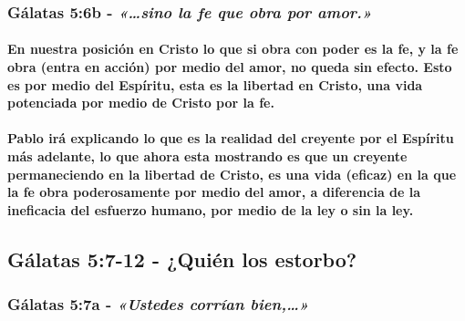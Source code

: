 \documentclass[11a pt,twoside]{article}
\newcommand{\scripture}[1]{%
  {\fontsize{12pt}{16pt}\selectfont\ScriptureFont\itshape #1}%
}
\let\oldsubsection\subsection
\renewcommand{\subsection}{\needspace{5\baselineskip}\oldsubsection}
\let\oldsubsubsection\subsubsection
\renewcommand{\subsubsection}{\needspace{4\baselineskip}\oldsubsubsection}
\let\oldparagraph\paragraph
\renewcommand{\paragraph}{\needspace{3\baselineskip}\oldparagraph}
\begin{document}
\subsubsection{\texorpdfstring{Gálatas 5:6b -
\scripture{«…sino la fe que obra por amor.»}}{Gálatas 5:6b - }}\label{guxe1latas-56b---sino-la-fe-que-obra-por-amor.}

\paragraph{En nuestra posición en Cristo lo que si obra con poder es la
fe, y la fe obra (entra en acción) por medio del amor, no queda sin
efecto. Esto es por medio del Espíritu, esta es la libertad en Cristo,
una vida potenciada por medio de Cristo por la
fe.}\label{en-nuestra-posiciuxf3n-en-cristo-lo-que-si-obra-con-poder-es-la-fe-y-la-fe-obra-entra-en-acciuxf3n-por-medio-del-amor-no-queda-sin-efecto.-esto-es-por-medio-del-espuxedritu-esta-es-la-libertad-en-cristo-una-vida-potenciada-por-medio-de-cristo-por-la-fe.}

\paragraph{Pablo irá explicando lo que es la realidad del creyente por
el Espíritu más adelante, lo que ahora esta mostrando es que un creyente
permaneciendo en la libertad de Cristo, es una vida (eficaz) en la que
la fe obra poderosamente por medio del amor, a diferencia de la
ineficacia del esfuerzo humano, por medio de la ley o sin la
ley.}\label{pablo-iruxe1-explicando-lo-que-es-la-realidad-del-creyente-por-el-espuxedritu-muxe1s-adelante-lo-que-ahora-esta-mostrando-es-que-un-creyente-permaneciendo-en-la-libertad-de-cristo-es-una-vida-eficaz-en-la-que-la-fe-obra-poderosamente-por-medio-del-amor-a-diferencia-de-la-ineficacia-del-esfuerzo-humano-por-medio-de-la-ley-o-sin-la-ley.}

\subsection{Gálatas 5:7-12 - ¿Quién los
estorbo?}\label{guxe1latas-57-12---quiuxe9n-los-estorbo}

\subsubsection{\texorpdfstring{Gálatas 5:7a -
\scripture{«Ustedes corrían bien,…»}}{Gálatas 5:7a - }}\label{guxe1latas-57a---ustedes-corruxedan-bien}
\end{document}
